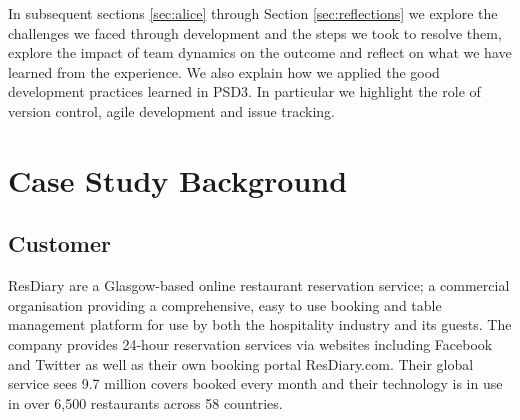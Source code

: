 \documentclass{l3proj}
\begin{document}
In subsequent sections \ref{sec:alice} through Section \ref{sec:reflections} we explore the challenges we faced through development and the steps we took to resolve them, explore the impact of team dynamics on the outcome and reflect on what we have learned from the experience. We also explain how we applied the good development practices learned in PSD3. In particular we highlight the role of version control, agile development and issue tracking.

\newpage



\section{Case Study Background}
\label{sec:background}

\subsection{Customer}
\label{sec:customer}


ResDiary are a Glasgow-based online restaurant reservation service; a commercial organisation providing a comprehensive, easy to use booking and table management platform for use by both the hospitality industry and its guests. The company provides 24-hour reservation services via websites including Facebook and Twitter as well as their own booking portal ResDiary.com. Their global service sees 9.7 million covers booked every month and their technology is in use in over 6,500 restaurants across 58 countries.
\end{document}
